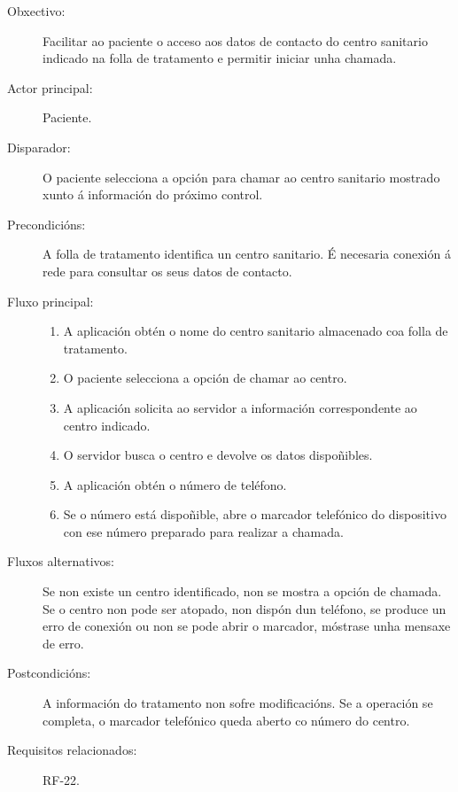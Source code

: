 \begin{description}

\item[Obxectivo:] Facilitar ao paciente o acceso aos datos de contacto do centro
sanitario indicado na folla de tratamento e permitir iniciar unha chamada.

\item[Actor principal:] Paciente.

\item[Disparador:] O paciente selecciona a opción para chamar ao centro sanitario
mostrado xunto á información do próximo control.

\item[Precondicións:] A folla de tratamento identifica un centro sanitario. É
necesaria conexión á rede para consultar os seus datos de contacto.

\item[Fluxo principal:] \hfill
\begin{enumerate}
    \item A aplicación obtén o nome do centro sanitario almacenado coa folla de
    tratamento.

    \item O paciente selecciona a opción de chamar ao centro.

    \item A aplicación solicita ao servidor a información correspondente ao
    centro indicado.

    \item O servidor busca o centro e devolve os datos dispoñibles.

    \item A aplicación obtén o número de teléfono.

    \item Se o número está dispoñible, abre o marcador telefónico do dispositivo
    con ese número preparado para realizar a chamada.
\end{enumerate}

\item[Fluxos alternativos:] Se non existe un centro identificado, non se mostra
a opción de chamada. Se o centro non pode ser atopado, non dispón dun teléfono,
se produce un erro de conexión ou non se pode abrir o marcador, móstrase unha
mensaxe de erro.

\item[Postcondicións:] A información do tratamento non sofre modificacións. Se
a operación se completa, o marcador telefónico queda aberto co número do centro.

\item[Requisitos relacionados:] RF-22.

\end{description}


